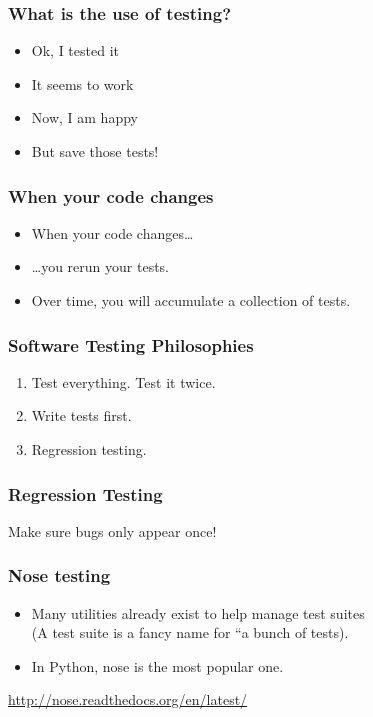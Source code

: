 \begin{frame}[fragile]
\frametitle{What is the use of testing?}

\begin{itemize}
\item Ok, I tested it
\item It seems to work
\item Now, I am happy
\pause
\item But save those tests!
\end{itemize}
\end{frame}

\begin{frame}[fragile]
\frametitle{When your code changes}

\begin{itemize}
\item When your code changes\ldots
\pause
\item \ldots you rerun your tests.
\item Over time, you will accumulate a collection of tests.
\end{itemize}
\end{frame}

\begin{frame}[fragile]
\frametitle{Software Testing Philosophies}

\begin{enumerate}
\item Test everything. Test it twice.
\item Write tests first.
\item Regression testing.
\end{enumerate}
\end{frame}

\begin{frame}[fragile]
\frametitle{Regression Testing}

Make sure bugs only appear once!

\end{frame}

\begin{frame}[fragile]
\frametitle{Nose testing}

\begin{itemize}
\item Many utilities already exist to help manage test suites\\
(A test suite is a fancy name for ``a bunch of tests).
\item In Python, \alert{nose} is the most popular one.
\end{itemize}

\url{http://nose.readthedocs.org/en/latest/}


\end{frame}





